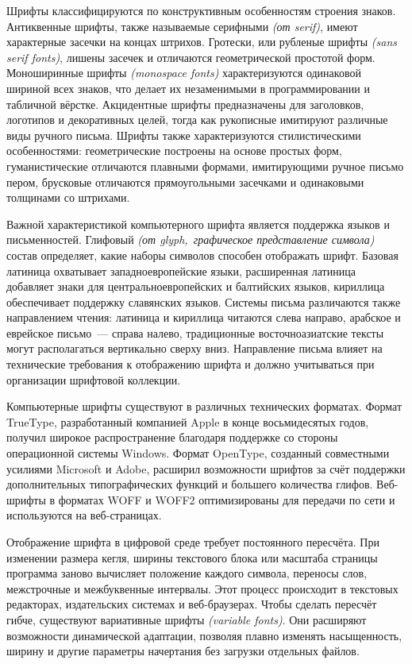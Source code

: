 Шрифты классифицируются по конструктивным особенностям строения знаков. Антиквенные шрифты, также называемые серифными \textit{(от serif)}, имеют характерные засечки на концах штрихов. Гротески, или рубленые шрифты \textit{(sans serif fonts)}, лишены засечек и отличаются геометрической простотой форм. Моноширинные шрифты \textit{(monospace fonts)} характеризуются одинаковой шириной всех знаков, что делает их незаменимыми в программировании и табличной вёрстке. Акцидентные шрифты предназначены для заголовков, логотипов и декоративных целей, тогда как рукописные имитируют различные виды ручного письма. Шрифты также характеризуются стилистическими особенностями: геометрические построены на основе простых форм, гуманистические отличаются плавными формами, имитирующими ручное письмо пером, брусковые отличаются прямоугольными засечками и одинаковыми толщинами со штрихами.

Важной характеристикой компьютерного шрифта является поддержка языков и письменностей. Глифовый \textit{(от glyph,~графическое представление символа)} состав определяет, какие наборы символов способен отображать шрифт. Базовая латиница охватывает западноевропейские языки, расширенная латиница добавляет знаки для центральноевропейских и балтийских языков, кириллица обеспечивает поддержку славянских языков. Системы письма различаются также направлением чтения: латиница и кириллица читаются слева направо, арабское и еврейское письмо~--- справа налево, традиционные восточноазиатские тексты могут располагаться вертикально сверху вниз. Направление письма влияет на технические требования к отображению шрифта и должно учитываться при организации шрифтовой коллекции.

Компьютерные шрифты существуют в различных технических форматах. Формат TrueType, разработанный компанией Apple в конце восьмидесятых годов, получил широкое распространение благодаря поддержке со стороны операционной системы Windows. Формат OpenType, созданный совместными усилиями Microsoft и Adobe, расширил возможности шрифтов за счёт поддержки дополнительных типографических функций и большего количества глифов. Веб-шрифты в форматах WOFF и WOFF2 оптимизированы для передачи по сети и используются на веб-страницах.

Отображение шрифта в цифровой среде требует постоянного пересчёта. При изменении размера кегля, ширины текстового блока или масштаба страницы программа заново вычисляет положение каждого символа, переносы слов, межстрочные и межбуквенные интервалы. Этот процесс происходит в текстовых редакторах, издательских системах и веб-браузерах. Чтобы сделать пересчёт гибче, существуют вариативные шрифты \textit{(variable fonts)}. Они расширяют возможности динамической адаптации, позволяя плавно изменять насыщенность, ширину и другие параметры начертания без загрузки отдельных файлов.

